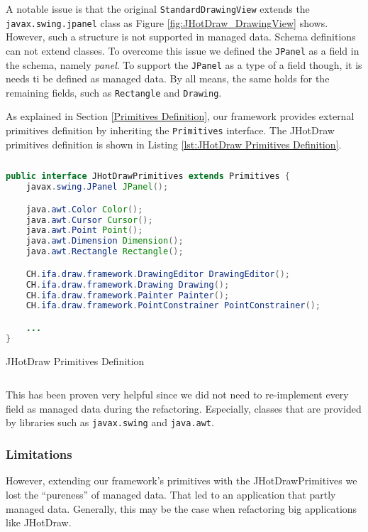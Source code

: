 A notable issue is that the original \texttt{StandardDrawingView} extends the \texttt{javax.swing.jpanel} class as Figure \ref{fig:JHotDraw_DrawingView} shows.
However, such a structure is not supported in managed data. 
Schema definitions can not extend classes.
To overcome this issue we defined the \texttt{JPanel} as a field in the schema, namely \textit{panel}.
To support the \texttt{JPanel} as a type of a field though, it is needs ti be defined as managed data.
By all means, the same holds for the remaining fields, such as \texttt{Rectangle} and \texttt{Drawing}.

As explained in Section \ref{Primitives Definition}, our framework provides external primitives definition by inheriting the \texttt{Primitives} interface.
The JHotDraw primitives definition is shown in Listing \ref{lst:JHotDraw Primitives Definition}.

\begin{sourcecode}[H]
	\begin{lstlisting}[language=Java, escapechar=|]
public interface JHotDrawPrimitives extends Primitives {
	javax.swing.JPanel JPanel();

	java.awt.Color Color();
	java.awt.Cursor Cursor();
	java.awt.Point Point();
	java.awt.Dimension Dimension();
	java.awt.Rectangle Rectangle();

	CH.ifa.draw.framework.DrawingEditor DrawingEditor();
	CH.ifa.draw.framework.Drawing Drawing();
	CH.ifa.draw.framework.Painter Painter();
	CH.ifa.draw.framework.PointConstrainer PointConstrainer();

	...
}
	\end{lstlisting}
	\caption{JHotDraw Primitives Definition}
	\label{lst:JHotDraw Primitives Definition}
\end{sourcecode}

This has been proven very helpful since we did not need to re-implement every field as managed data during the refactoring. 
Especially, classes that are provided by libraries such as \texttt{javax.swing} and \texttt{java.awt}.

\subsubsection{Limitations}
However, extending our framework's primitives with the JHotDrawPrimitives we lost the ``pureness'' of managed data.
That led to an application that partly managed data.
Generally, this may be the case when refactoring big applications like JHotDraw.

